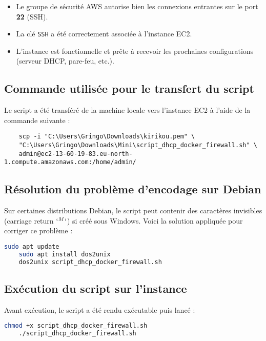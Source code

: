 \begin{itemize}
	\item Le groupe de sécurité AWS autorise bien les connexions entrantes sur le port \textbf{22} (SSH).
	\item La clé \texttt{SSH} a été correctement associée à l’instance EC2.
	\item L’instance est fonctionnelle et prête à recevoir les prochaines configurations (serveur DHCP, pare-feu, etc.).
\end{itemize}

\subsection*{Commande utilisée pour le transfert du script}

Le script a été transféré de la machine locale vers l’instance EC2 à l’aide de la commande suivante :

\begin{lstlisting}
	scp -i "C:\Users\Gringo\Downloads\kirikou.pem" \
	"C:\Users\Gringo\Downloads\Mini\script_dhcp_docker_firewall.sh" \
	admin@ec2-13-60-19-83.eu-north-1.compute.amazonaws.com:/home/admin/
\end{lstlisting}

\subsection*{Résolution du problème d'encodage sur Debian}

Sur certaines distributions Debian, le script peut contenir des caractères invisibles (carriage return $ `^M` $) si créé sous Windows. Voici la solution appliquée pour corriger ce problème :

\begin{lstlisting}[language=bash]
	sudo apt update
	sudo apt install dos2unix
	dos2unix script_dhcp_docker_firewall.sh
\end{lstlisting}

\subsection*{Exécution du script sur l’instance}

Avant exécution, le script a été rendu exécutable puis lancé :

\begin{lstlisting}[language=bash]
	chmod +x script_dhcp_docker_firewall.sh
	./script_dhcp_docker_firewall.sh
\end{lstlisting}

